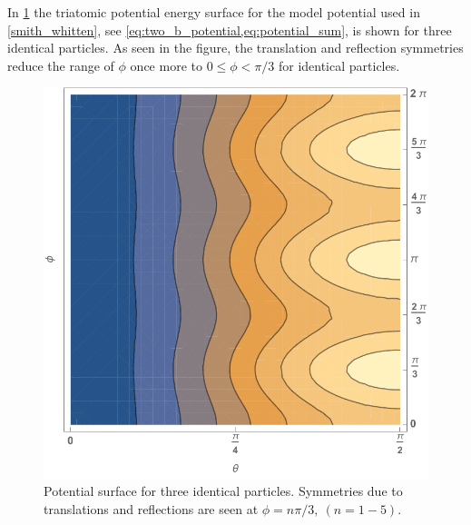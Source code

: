 In \cref{fig:potential} the triatomic potential energy surface for the model potential used in \cref{smith_whitten}, see \cref{eq:two_b_potential,eq:potential_sum}, is shown for three identical particles. As seen in the figure, the translation and reflection symmetries reduce the range of $\phi$ once more to $0 \leq \phi < \pi/3$ for identical particles. 

\begin{figure}
	\includegraphics[width=\linewidth]{potential.pdf}
	\caption{Potential surface for three identical particles. Symmetries due to translations and reflections are seen at $\phi = n\pi/3, \ (n = 1-5)$.}
	\label{fig:potential}
\end{figure}
